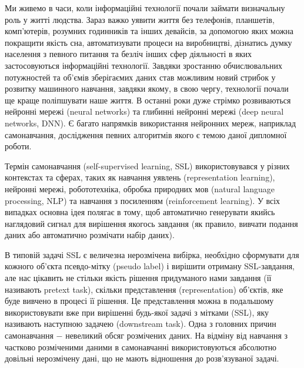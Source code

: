
Ми живемо в часи, коли інформаційні технології почали займати визначальну роль у житті людства. Зараз важко уявити життя без телефонів, планшетів, комп'ютерів, розумних годинників та інших девайсів, за допомогою яких можна покращити якість сна, автоматизувати процеси на виробництві, дізнатись думку населення з певного питання та безліч інших сфер діяльності в яких застосовуються інформаційні технології. Завдяки зростанню обчислювальних потужностей та об'ємів зберігаємих даних став можливим новий стрибок у розвитку машинного навчання, завдяки якому, в свою чергу, технології почали ще краще поліпшувати наше життя. В останні роки дуже стрімко розвиваються нейронні мережі (neural networks) та глибинні нейронні мережі (deep neural networks, DNN). Є багато напрямків використання нейронних мереж, наприклад самонавчання, дослідження певних алгоритмів якого є темою даної дипломної роботи.

Термін самонавчання (self-supervised learning, SSL) використовувався у різних контекстах та сферах, таких як навчання уявлень (representation learning), нейронні мережі, робототехніка, обробка природних мов (natural language processing, NLP) та навчання з посиленням (reinforcement learning). У всіх випадках основна ідея полягає в тому, щоб автоматично генерувати якийсь наглядовий сигнал для вирішення якогось завдання (як правило, вивчати подання даних або автоматично розмічати набір даних).

В типовій задачі SSL є величезна нерозмічена вибірка, необхідно сформувати для кожного об'єкта псевдо-мітку (pseudo label) і вирішити отриману SSL-завдання, але нас цікавить не стільки якість рішення придуманого нами завдання (її називають pretext task), скільки представлення (representation) об'єктів, яке буде вивчено в процесі її рішення. Це представлення можна в подальшому використовувати вже при вирішенні будь-якої задачі з мітками (SSL), яку називають наступною задачею (downstream task). Одна з головних причин самонавчання $-$ невеликий обсяг розмічених даних. На відміну від навчання з частково розміченими даними в самонавчанні використовуються абсолютно довільні нерозмічену дані, що не мають відношення до розв'язуваної задачі.

